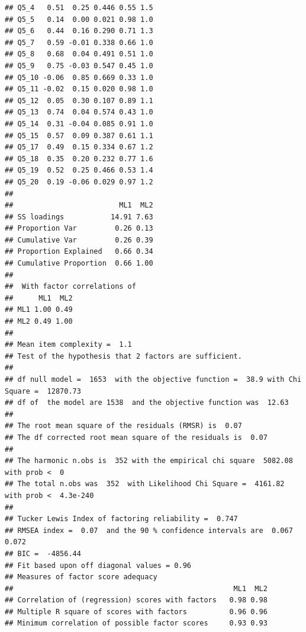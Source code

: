 \documentclass[
  man]{apa6}
\begin{document}
\begin{verbatim}
## Q5_4   0.51  0.25 0.446 0.55 1.5
## Q5_5   0.14  0.00 0.021 0.98 1.0
## Q5_6   0.44  0.16 0.290 0.71 1.3
## Q5_7   0.59 -0.01 0.338 0.66 1.0
## Q5_8   0.68  0.04 0.491 0.51 1.0
## Q5_9   0.75 -0.03 0.547 0.45 1.0
## Q5_10 -0.06  0.85 0.669 0.33 1.0
## Q5_11 -0.02  0.15 0.020 0.98 1.0
## Q5_12  0.05  0.30 0.107 0.89 1.1
## Q5_13  0.74  0.04 0.574 0.43 1.0
## Q5_14  0.31 -0.04 0.085 0.91 1.0
## Q5_15  0.57  0.09 0.387 0.61 1.1
## Q5_17  0.49  0.15 0.334 0.67 1.2
## Q5_18  0.35  0.20 0.232 0.77 1.6
## Q5_19  0.52  0.25 0.466 0.53 1.4
## Q5_20  0.19 -0.06 0.029 0.97 1.2
## 
##                         ML1  ML2
## SS loadings           14.91 7.63
## Proportion Var         0.26 0.13
## Cumulative Var         0.26 0.39
## Proportion Explained   0.66 0.34
## Cumulative Proportion  0.66 1.00
## 
##  With factor correlations of 
##      ML1  ML2
## ML1 1.00 0.49
## ML2 0.49 1.00
## 
## Mean item complexity =  1.1
## Test of the hypothesis that 2 factors are sufficient.
## 
## df null model =  1653  with the objective function =  38.9 with Chi Square =  12870.73
## df of  the model are 1538  and the objective function was  12.63 
## 
## The root mean square of the residuals (RMSR) is  0.07 
## The df corrected root mean square of the residuals is  0.07 
## 
## The harmonic n.obs is  352 with the empirical chi square  5082.08  with prob <  0 
## The total n.obs was  352  with Likelihood Chi Square =  4161.82  with prob <  4.3e-240 
## 
## Tucker Lewis Index of factoring reliability =  0.747
## RMSEA index =  0.07  and the 90 % confidence intervals are  0.067 0.072
## BIC =  -4856.44
## Fit based upon off diagonal values = 0.96
## Measures of factor score adequacy             
##                                                    ML1  ML2
## Correlation of (regression) scores with factors   0.98 0.98
## Multiple R square of scores with factors          0.96 0.96
## Minimum correlation of possible factor scores     0.93 0.93
\end{verbatim}
\end{document}
